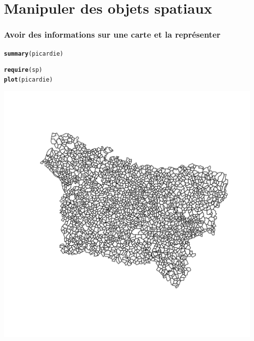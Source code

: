 \documentclass[slidetop, 10pt]{beamer}\usepackage{graphicx, color}
\makeatletter
\newcommand{\hlfunctioncall}[1]{\textcolor[rgb]{0.501960784313725,0,0.329411764705882}{\textbf{#1}}}%
\newenvironment{kframe}{%
 \def\at@end@of@kframe{}%
 \ifinner\ifhmode%
  \def\at@end@of@kframe{\end{minipage}}%
  \begin{minipage}{\columnwidth}%
 \fi\fi%
 \def\FrameCommand##1{\hskip\@totalleftmargin \hskip-\fboxsep
 \colorbox{shadecolor}{##1}\hskip-\fboxsep
     \hskip-\linewidth \hskip-\@totalleftmargin \hskip\columnwidth}%
 \MakeFramed {\advance\hsize-\width
   \@totalleftmargin\z@ \linewidth\hsize
   \@setminipage}}%
 {\par\unskip\endMakeFramed%
 \at@end@of@kframe}
\newenvironment{knitrout}{}{} %
\renewenvironment{knitrout}{\begin{tiny}}{\end{tiny}}
\makeatother
\begin{document}
\section{Manipuler des objets spatiaux}
\begin{frame}[fragile]
\frametitle{Avoir des informations sur une carte et la représenter}
\begin{knitrout}\tiny
{}\color{fgcolor}\begin{kframe}
\begin{alltt}
\hlfunctioncall{summary}(picardie)
\end{alltt}
\end{kframe}
\end{knitrout}

\begin{knitrout}\tiny
{}\color{fgcolor}\begin{kframe}
\begin{alltt}
\hlfunctioncall{require}(sp)
\hlfunctioncall{plot}(picardie)
\end{alltt}
\end{kframe}
\end{knitrout}


\begin{knitrout}\tiny
{}\color{fgcolor}

{\centering \includegraphics[width=.7\linewidth]{images/shp4} 

}


\end{knitrout}


\end{frame}
\end{document}
